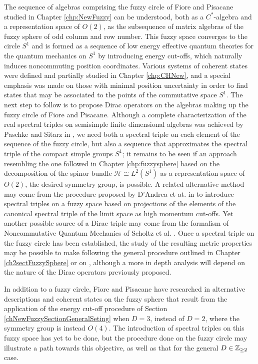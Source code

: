 \documentclass[12pt]{report}
\theoremstyle{definition}
\newcommand{\hcal}{\mathcal H}
\begin{document}
The sequence of algebras comprising the fuzzy circle of Fiore and Pisacane studied in Chapter \ref{chp:NewFuzzy} can be understood, both as a $C^*$-algebra and a representation space of $O(2)$, as the subsequence of matrix algebras of the fuzzy sphere of odd column and row number. This fuzzy space converges to the circle $S^1$ and is formed as a sequence of low energy effective quantum theories for the quantum mechanics on $S^1$ by introducing energy cut-offs, which naturally induces noncommuting position coordinates.
Various systems of coherent states were defined and partially studied in Chapter \ref{chp:CHNew}, and a special emphasis was made on those with minimal position uncertainty in order to find states that may be associated to the points of the commutative space $S^1$.
The next step to follow is to propose Dirac operators on the algebras making up the fuzzy circle of Fiore and Pisacane. Although a complete characterization of the real spectral triples on semisimple finite dimensional algebras was achieved by Paschke and Sitarz in  \cite{PaschkeSitarz1998}, we need both a spectral triple on each element of the sequence of the fuzzy circle, but also a sequence that approximates the spectral triple of the compact simple groups $S^1$; it remains to be seen if an approach resembling the one followed in Chapter \ref{chp:fuzzysphere} based on the decomposition of the spinor bundle $\hcal \cong L^2(S^1)$ as a representation space of $O(2)$, the desired symmetry group, is possible. A related alternative method may come from the procedure proposed by D'Andrea et at. in \cite{DAndrea2014} to introduce spectral triples on a fuzzy space based on projections of the elements of the canonical spectral triple of the limit space as high momentum cut-offs. Yet another possible source of a Dirac triple may come from the formalism of Noncommutative Quantum Mechanics of Scholtz et al. \cite{Scholtz2009,Scholtz2013}. Once a spectral triple on the fuzzy circle has been established, the study of the resulting metric properties may be possible to make following the general procedure outlined in Chapter \ref{ch2sectFuzzySphere} or on \cite{ChaobaDevi2018}, although a more in depth analysis will depend on the nature of the Dirac operators previously proposed. 

In addition to a fuzzy circle, Fiore and Pisacane have researched in \cite{Fiore2018, FioreXi2020, FioreCoherent2020} alternative descriptions and coherent states on the fuzzy sphere that result from the application of the energy cut-off procedure of Section \ref{chNewFuzzySectionGeneralSeting} when $D = 3$, instead of $D=2$, where the symmetry group is instead $O(4)$. The introduction of spectral triples on this fuzzy space has yet to be done, but the procedure done on the fuzzy circle may illustrate a path towards this objective, as well as that for the general $ D \in \mathbb{Z}_{\geq 2}$ case.


\printbibliography
\end{document}
